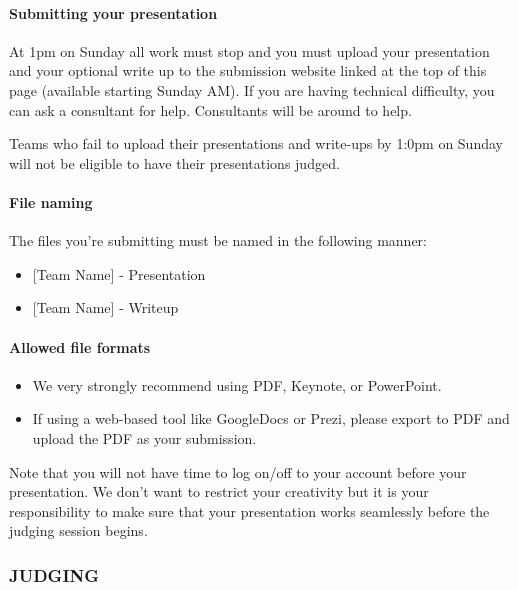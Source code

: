 \documentclass[]{article}
\providecommand{\tightlist}{%
  \setlength{\itemsep}{0pt}\setlength{\parskip}{0pt}}
\let\oldparagraph\paragraph
\renewcommand{\paragraph}[1]{\oldparagraph{#1}\mbox{}}
\begin{document}
\hypertarget{submitting-your-presentation}{%
\paragraph{Submitting your
presentation}\label{submitting-your-presentation}}

At 1pm on Sunday all work must stop and you must upload your
presentation and your optional write up to the submission website linked
at the top of this page (available starting Sunday AM). If you are
having technical difficulty, you can ask a consultant for help.
Consultants will be around to help.

Teams who fail to upload their presentations and write-ups by 1:0pm on
Sunday will not be eligible to have their presentations judged.

\hypertarget{file-naming}{%
\paragraph{File naming}\label{file-naming}}

The files you're submitting must be named in the following manner:

\begin{itemize}
\tightlist
\item
  {[}Team Name{]} - Presentation
\item
  {[}Team Name{]} - Writeup
\end{itemize}

\hypertarget{allowed-file-formats}{%
\paragraph{Allowed file formats}\label{allowed-file-formats}}

\begin{itemize}
\tightlist
\item
  We very strongly recommend using PDF, Keynote, or PowerPoint.
\item
  If using a web-based tool like GoogleDocs or Prezi, please export to
  PDF and upload the PDF as your submission.
\end{itemize}

Note that you will not have time to log on/off to your account before
your presentation. We don't want to restrict your creativity but it is
your responsibility to make sure that your presentation works seamlessly
before the judging session begins.

\hypertarget{judging}{%
\subsubsection{JUDGING}\label{judging}}
\end{document}
